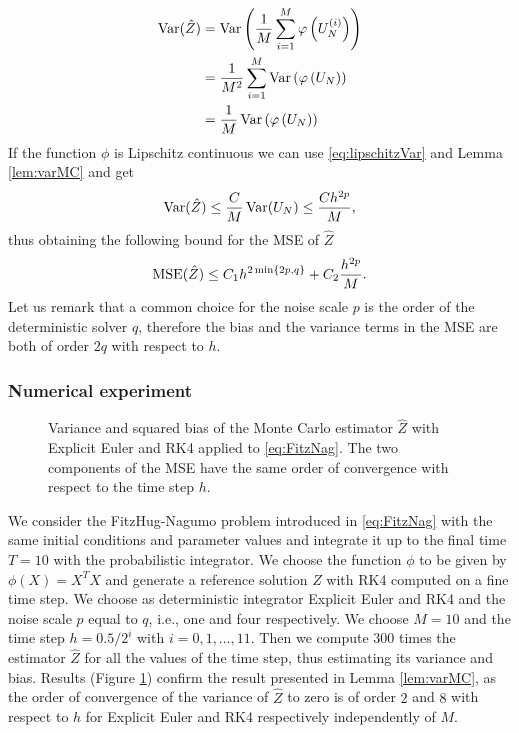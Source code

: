 \begin{equation}
\begin{aligned}
	\operatorname{Var}(\hat Z) &= \operatorname{Var}\left(\frac{1}{M} \sum_{i = 1}^M \varphi\left(U_N^{(i)}\right)\right) \\
	&= \frac{1}{M^2} \sum_{i = 1}^M \operatorname{Var}\left(\varphi\left(U_N\right)\right) \\
	&= \frac{1}{M} \operatorname{Var}\left(\varphi\left(U_N\right)\right) \\
\end{aligned}
\end{equation}
If the function $\phi$ is Lipschitz continuous we can use \eqref{eq:lipschitzVar} and Lemma \ref{lem:varMC} and get
\begin{equation}
	\operatorname{Var}(\hat Z) \leq \frac{C}{M} \operatorname{Var}(U_N) \leq \frac{Ch^{2p}}{M},
\end{equation}
thus obtaining the following bound for the MSE of $\hat Z$ 
\begin{equation}
	\operatorname{MSE}(\hat Z) \leq C_1 h^{2\min\{2p, q\}} + C_2 \frac{h^{2p}}{M}.
\end{equation}
Let us remark \cite{CGS16} that a common choice for the noise scale $p$ is the order of the deterministic solver $q$, therefore the bias and the variance terms in the MSE are both of order $2q$ with respect to $h$.

\subsubsection{Numerical experiment}

\begin{figure}
	\centering
	\resizebox{0.6\linewidth}{!}{}
	\caption{Variance and squared bias of the Monte Carlo estimator $\hat Z$ with Explicit Euler and RK4 applied to \eqref{eq:FitzNag}. The two components of the MSE have the same order of convergence with respect to the time step $h$.}
	\label{fig:MonteCarloVariance}
\end{figure}

We consider the FitzHug-Nagumo problem introduced in \eqref{eq:FitzNag} with the same initial conditions and parameter values and integrate it up to the final time $T = 10$ with the probabilistic integrator. We choose the function $\phi$ to be given by $\phi(X) = X^TX$ and generate a reference solution $Z$ with RK4 computed on a fine time step. We choose as deterministic integrator Explicit Euler and RK4 and the noise scale $p$ equal to $q$, i.e., one and four respectively. We choose $M = 10$ and the time step $h = 0.5 / 2^i$ with $i = 0, 1, \ldots, 11$. Then we compute $300$ times the estimator $\hat Z$ for all the values of the time step, thus estimating its variance and bias. Results (Figure \ref{fig:MonteCarloVariance}) confirm the result presented in Lemma \ref{lem:varMC}, as the order of convergence of the variance of $\hat{Z}$ to zero is of order $2$ and $8$ with respect to $h$ for Explicit Euler and RK4 respectively independently of $M$. 


